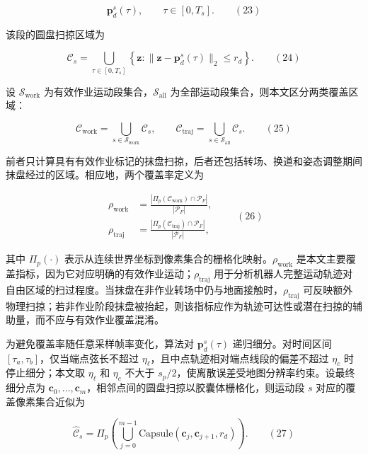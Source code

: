   

$$
\mathbf p_d^s(\tau),\qquad \tau\in[0,T_s].
\qquad(23)
$$

  

该段的圆盘扫掠区域为

  

$$
\mathcal C_s
=\bigcup_{\tau\in[0,T_s]}
\left\{\mathbf z:
\|\mathbf z-\mathbf p_d^s(\tau)\|_2\le r_d\right\}.
\qquad(24)
$$

  

设 $\mathcal S_{\mathrm{work}}$ 为有效作业运动段集合，$\mathcal S_{\mathrm{all}}$ 为全部运动段集合，则本文区分两类覆盖区域：

  

$$
\mathcal C_{\mathrm{work}}
=\bigcup_{s\in\mathcal S_{\mathrm{work}}}\mathcal C_s,
\qquad
\mathcal C_{\mathrm{traj}}
=\bigcup_{s\in\mathcal S_{\mathrm{all}}}\mathcal C_s.
\qquad(25)
$$

  

前者只计算具有有效作业标记的抹盘扫掠，后者还包括转场、换道和姿态调整期间抹盘经过的区域。相应地，两个覆盖率定义为

  

$$
\begin{aligned}
\rho_{\mathrm{work}}
&=\frac{|\Pi_p(\mathcal C_{\mathrm{work}})\cap\mathcal P_F|}
{|\mathcal P_F|},\\
\rho_{\mathrm{traj}}
&=\frac{|\Pi_p(\mathcal C_{\mathrm{traj}})\cap\mathcal P_F|}
{|\mathcal P_F|},
\end{aligned}
\qquad(26)
$$

  

其中 $\Pi_p(\cdot)$ 表示从连续世界坐标到像素集合的栅格化映射。$\rho_{\mathrm{work}}$ 是本文主要覆盖指标，因为它对应明确的有效作业运动；$\rho_{\mathrm{traj}}$ 用于分析机器人完整运动轨迹对自由区域的扫过程度。当抹盘在非作业转场中仍与地面接触时，$\rho_{\mathrm{traj}}$ 可反映额外物理扫掠；若非作业阶段抹盘被抬起，则该指标应作为轨迹可达性或潜在扫掠的辅助量，而不应与有效作业覆盖混淆。

  

为避免覆盖率随任意采样帧率变化，算法对 $\mathbf p_d^s(\tau)$ 递归细分。对时间区间 $[\tau_a,\tau_b]$，仅当端点弦长不超过 $\eta_\ell$，且中点轨迹相对端点线段的偏差不超过 $\eta_c$ 时停止细分；本文取 $\eta_\ell$ 和 $\eta_c$ 不大于 $s_p/2$，使离散误差受地图分辨率约束。设最终细分点为 $\mathbf c_0,\ldots,\mathbf c_m$，相邻点间的圆盘扫掠以胶囊体栅格化，则运动段 $s$ 对应的覆盖像素集合近似为

  

$$
\widehat{\mathcal C}_s
=\Pi_p\!\left(
\bigcup_{j=0}^{m-1}
\mathrm{Capsule}(\mathbf c_j,\mathbf c_{j+1},r_d)
\right).
\qquad(27)
$$

